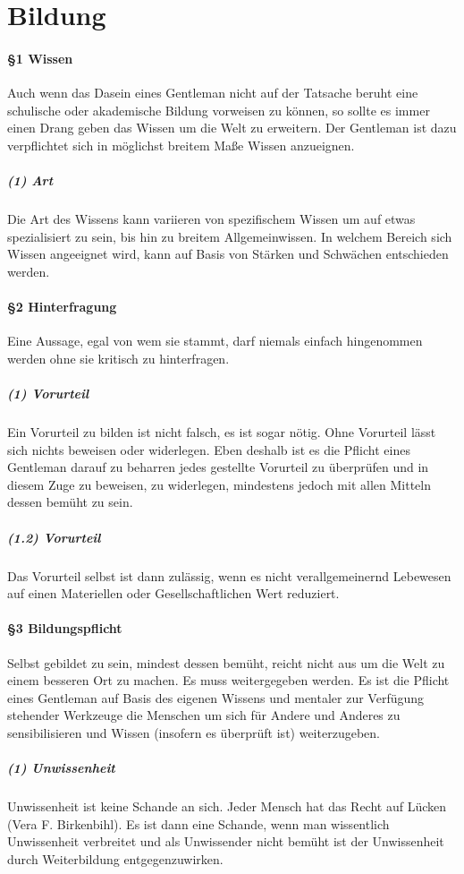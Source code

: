 \section{Bildung}
\paragraph{§1 Wissen}
Auch wenn das Dasein eines Gentleman nicht auf der Tatsache beruht eine schulische oder akademische Bildung vorweisen zu können, so sollte es immer einen Drang geben das Wissen um die Welt zu erweitern. Der Gentleman ist dazu verpflichtet sich in möglichst breitem Maße Wissen anzueignen.

\subparagraph{(1) Art} Die Art des Wissens kann variieren von spezifischem Wissen um auf etwas spezialisiert zu sein, bis hin zu breitem Allgemeinwissen. In welchem Bereich sich Wissen angeeignet wird, kann auf Basis von Stärken und Schwächen entschieden werden.

\paragraph{§2 Hinterfragung}
Eine Aussage, egal von wem sie stammt, darf niemals einfach hingenommen werden ohne sie kritisch zu hinterfragen.

\subparagraph{(1) Vorurteil}
Ein Vorurteil zu bilden ist nicht falsch, es ist sogar nötig. Ohne Vorurteil lässt sich nichts beweisen oder widerlegen. Eben deshalb ist es die Pflicht eines Gentleman darauf zu beharren jedes gestellte Vorurteil zu überprüfen und in diesem Zuge zu beweisen, zu widerlegen, mindestens jedoch mit allen Mitteln dessen bemüht zu sein.

\subparagraph{(1.2) Vorurteil}
Das Vorurteil selbst ist dann zulässig, wenn es nicht verallgemeinernd Lebewesen auf einen Materiellen oder Gesellschaftlichen Wert reduziert.

\paragraph{§3 Bildungspflicht}
Selbst gebildet zu sein, mindest dessen bemüht, reicht nicht aus um die Welt zu einem besseren Ort zu machen. Es muss weitergegeben werden. Es ist die Pflicht eines Gentleman auf Basis des eigenen Wissens und mentaler zur Verfügung stehender Werkzeuge die Menschen um sich für Andere und Anderes zu sensibilisieren und Wissen (insofern es überprüft ist) weiterzugeben.

\subparagraph{(1) Unwissenheit}
Unwissenheit ist keine Schande an sich. \glqq Jeder Mensch hat das Recht auf Lücken\grqq \\  (Vera F. Birkenbihl). Es ist dann eine Schande, wenn man wissentlich Unwissenheit verbreitet und als Unwissender nicht bemüht ist der Unwissenheit durch Weiterbildung entgegenzuwirken.

